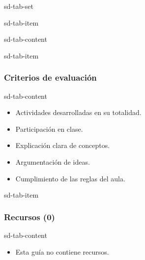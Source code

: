 \documentclass[letterpaper,10pt,spanish]{sphinxmanual}
\begin{document}
\begin{sphinxuseclass}{sd-tab-set}
\begin{sphinxuseclass}{sd-tab-item}
\begin{sphinxuseclass}{sd-tab-content}
\begin{itemize}
\end{itemize}

\end{sphinxuseclass}
\end{sphinxuseclass}
\begin{sphinxuseclass}{sd-tab-item}\subsubsection*{Criterios de evaluación}

\begin{sphinxuseclass}{sd-tab-content}\begin{itemize}
\item {} 
\sphinxAtStartPar
Actividades desarrolladas en su totalidad.

\item {} 
\sphinxAtStartPar
Participación en clase.

\item {} 
\sphinxAtStartPar
Explicación clara de conceptos.

\item {} 
\sphinxAtStartPar
Argumentación de ideas.

\item {} 
\sphinxAtStartPar
Cumplimiento de las reglas del aula.

\end{itemize}

\end{sphinxuseclass}
\end{sphinxuseclass}
\begin{sphinxuseclass}{sd-tab-item}\subsubsection*{Recursos (0)}

\begin{sphinxuseclass}{sd-tab-content}\begin{itemize}
\item {} 
\sphinxAtStartPar
Esta guía no contiene recursos.

\end{itemize}

\end{sphinxuseclass}
\end{sphinxuseclass}
\end{sphinxuseclass}
\end{document}
